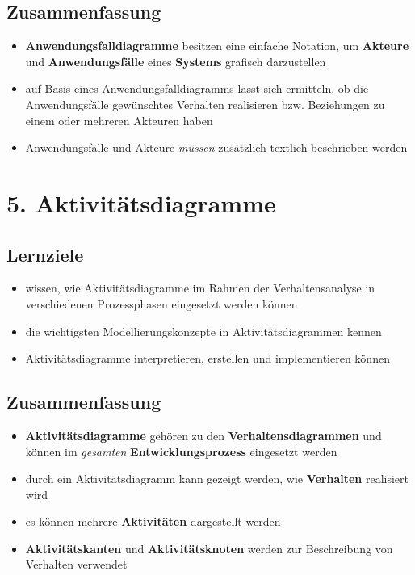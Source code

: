 \subsection*{Zusammenfassung}

\begin{itemize}
    \item \textbf{Anwendungsfalldiagramme} besitzen eine einfache Notation, um \textbf{Akteure} und \textbf{Anwendungsfälle} eines \textbf{Systems} grafisch darzustellen
    \item auf Basis eines Anwendungsfalldiagramms lässt sich ermitteln, ob die Anwendungsfälle gewünschtes Verhalten realisieren bzw. Beziehungen zu einem oder mehreren Akteuren haben
    \item Anwendungsfälle und Akteure \textit{müssen} zusätzlich textlich beschrieben werden
\end{itemize}

\section*{5. Aktivitätsdiagramme}

\subsection*{Lernziele}
\begin{itemize}
    \item wissen, wie Aktivitätsdiagramme im Rahmen der Verhaltensanalyse in verschiedenen Prozessphasen eingesetzt werden können
    \item die wichtigsten Modellierungskonzepte in Aktivitätsdiagrammen kennen
    \item Aktivitätsdiagramme interpretieren, erstellen und implementieren können
\end{itemize}

\subsection*{Zusammenfassung}

\begin{itemize}
    \item \textbf{Aktivitätsdiagramme} gehören zu den \textbf{Verhaltensdiagrammen} und können im \textit{gesamten} \textbf{Entwicklungsprozess} eingesetzt werden
    \item durch ein Aktivitätsdiagramm kann gezeigt werden, wie \textbf{Verhalten} realisiert wird
    \item es können mehrere \textbf{Aktivitäten} dargestellt werden
    \item \textbf{Aktivitätskanten} und \textbf{Aktivitätsknoten} werden zur Beschreibung von Verhalten verwendet
\end{itemize}

